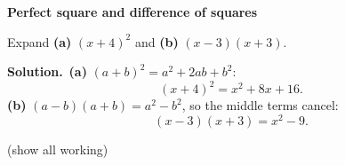 \documentclass[11pt]{article}
\begin{document}
\begin{workedbox}

{\bfseries\color{chalkdk}Perfect square and difference of squares}\par\vspace{3pt}

Expand \textbf{(a)} $(x+4)^2$ and \textbf{(b)} $(x-3)(x+3)$.\par\vspace{2pt}

{\bfseries Solution.}\ \textbf{(a)} $(a+b)^2=a^2+2ab+b^2$: \[(x+4)^2=x^2+8x+16.\] \textbf{(b)} $(a-b)(a+b)=a^2-b^2$, so the middle terms cancel: \[(x-3)(x+3)=x^2-9.\]

\end{workedbox}

\;\textcolor{inksoft}{\small(show all working)}\par\vspace{2pt}
\end{document}
